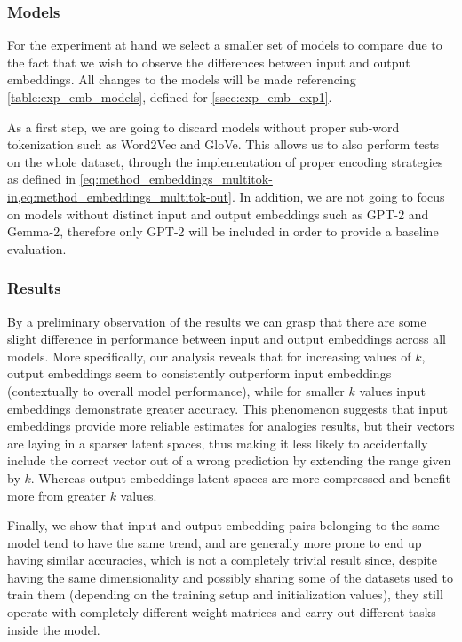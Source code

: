 \subsubsection{Models}\label{sssec:exp_emb_exp2_models}

For the experiment at hand we select a smaller set of models to compare due to the fact that we wish to observe the differences between input and output embeddings.
All changes to the models will be made referencing \cref{table:exp_emb_models}, defined for \cref{ssec:exp_emb_exp1}.

As a first step, we are going to discard models without proper sub-word tokenization such as Word2Vec and GloVe. 
This allows us to also perform tests on the whole dataset, through the implementation of proper encoding strategies as defined in \cref{eq:method_embeddings_multitok-in,eq:method_embeddings_multitok-out}.
In addition, we are not going to focus on models without distinct input and output embeddings such as GPT-2 and Gemma-2, therefore only GPT-2 will be included in order to provide a baseline evaluation.

\subsubsection{Results}

By a preliminary observation of the results we can grasp that there are some slight difference in performance between input and output embeddings across all models.
More specifically, our analysis reveals that for increasing values of $k$, output embeddings seem to consistently outperform input embeddings (contextually to overall model performance), while for smaller $k$ values input embeddings demonstrate greater accuracy.
This phenomenon suggests that input embeddings provide more reliable estimates for analogies results, but their vectors are laying in a sparser latent spaces, thus making it less likely to accidentally include the correct vector out of a wrong prediction by extending the range given by $k$.
Whereas output embeddings latent spaces are more compressed and benefit more from greater $k$ values.

Finally, we show that input and output embedding pairs belonging to the same model tend to have the same trend, and are generally more prone to end up having similar accuracies, which is not a completely trivial result since, despite having the same dimensionality and possibly sharing some of the datasets used to train them (depending on the training setup and initialization values), they still operate with completely different weight matrices and carry out different tasks inside the model.

